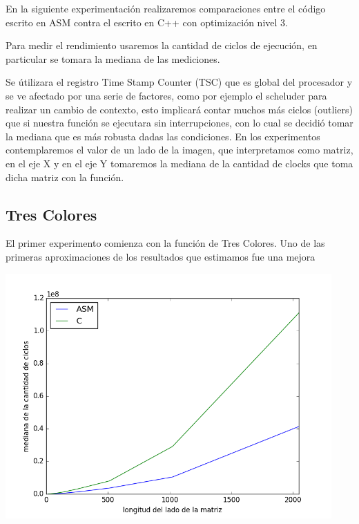 En la siguiente experimentación realizaremos comparaciones entre el código escrito en ASM contra el escrito en C++ con optimización nivel 3.

Para medir el rendimiento usaremos la cantidad de ciclos de ejecución, en particular se tomara la mediana de las mediciones.

Se útilizara el registro Time Stamp Counter (TSC) que es global del procesador y se ve afectado por una serie de factores, como por ejemplo el scheluder para realizar un cambio de contexto, esto implicará contar muchos más ciclos (outliers) que si nuestra función se ejecutara sin interrupciones, con lo cual se decidió tomar la mediana que es más robusta dadas las condiciones. En los experimentos contemplaremos el valor de un lado de la imagen, que interpretamos como matriz, en el eje X y en el eje Y tomaremos la mediana de la cantidad de clocks que toma dicha matriz con la función.



\subsection{Tres Colores}

El primer experimento comienza con la función de Tres Colores. Uno de las primeras aproximaciones de los resultados que estimamos fue una mejora

\vspace{6px}
\begin{center}
\includegraphics[width=12.5cm, height=9
cm]{images/car_tresColores.png}
\end{center}
\vspace{6px}


